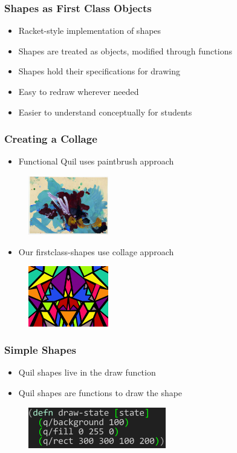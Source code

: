 \documentclass{beamer}
\begin{document}
\begin{frame}
\frametitle{Shapes as First Class Objects}
	\begin{itemize}
		\item Racket-style implementation of shapes
		\item Shapes are treated as objects, modified through functions
		\item Shapes hold their specifications for drawing
		\item Easy to redraw wherever needed
		\item Easier to understand conceptually for students
	\end{itemize}
\end{frame}

\begin{frame}
\frametitle{Creating a Collage}
	\begin{itemize}
		\item Functional Quil uses paintbrush approach
	\end{itemize}
	\begin{figure}
	\includegraphics[width=3.5cm]{PresentationImages/painting.jpg}
	\end{figure}
	\begin{itemize}
		\item Our firstclass-shapes use collage approach
	\end{itemize}
	\begin{figure}
	\includegraphics[width=3.5cm]{PresentationImages/collage.jpg}
	\end{figure}
\end{frame}

\begin{frame}
\frametitle{Simple Shapes}
	\begin{itemize}
		\item Quil shapes live in the draw function
		\item Quil shapes are functions to draw the shape
	\end{itemize}
	\begin{figure}
		\includegraphics[width=6cm]{PresentationImages/quilGreenRect.png}
	\end{figure}
\end{frame}
\end{document}
